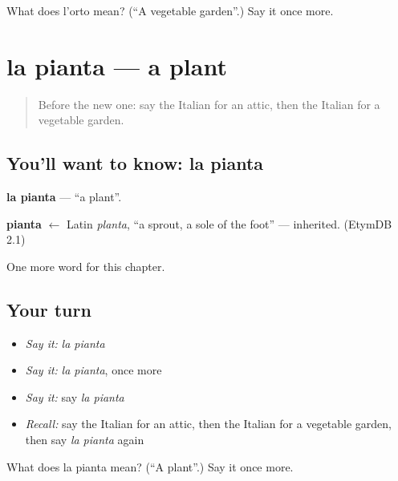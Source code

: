 \begin{tcolorbox}[breakable,colback=teal!4,colframe=teal!35!black,title={Before you move on}]
What does l'orto mean? (\textquotedblleft{}A vegetable garden\textquotedblright{}.) Say it once more.
\end{tcolorbox}
\section[la pianta]{la pianta — a plant}

\label{lesson:IT-C168-pianta}



\begin{quote}
Before the new one: say the Italian for an attic, then the Italian for a vegetable garden.
\end{quote}

\subsection*{You'll want to know: la pianta}
\textbf{la pianta} — \textquotedblleft{}a plant\textquotedblright{}.

\begin{cousinweb}
\textbf{pianta} $\leftarrow$ Latin \emph{planta}, \textquotedblleft{}a sprout, a sole of the foot\textquotedblright{} — inherited. (EtymDB 2.1)
\end{cousinweb}

\begin{grammarlens}[title={What you've built}]
One more word for this chapter.
\end{grammarlens}

\subsection*{Your turn}
\begin{itemize}
\raggedright
  \item \emph{Say it:} \emph{la pianta}
  \item \emph{Say it:} \emph{la pianta}, once more
  \item \emph{Say it:} say \emph{la pianta}
  \item \emph{Recall:} say the Italian for an attic, then the Italian for a vegetable garden, then say \emph{la pianta} again
\end{itemize}

\begin{tcolorbox}[breakable,colback=teal!4,colframe=teal!35!black,title={Before you move on}]
What does la pianta mean? (\textquotedblleft{}A plant\textquotedblright{}.) Say it once more.
\end{tcolorbox}
